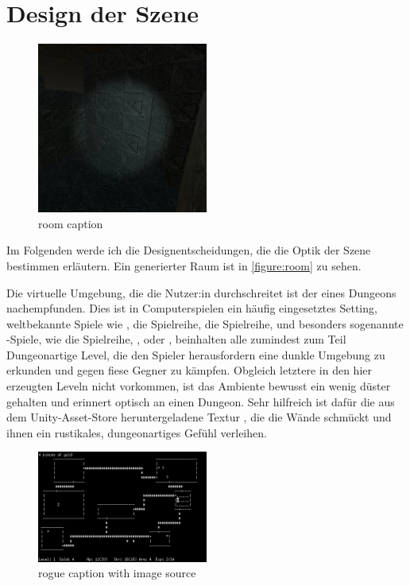 \section{Design der Szene} \label{sec:scene-design}

\begin{figure}[!h]
    \centering
    \includegraphics[width=0.5\textwidth]{vrscreenshots/rauminnen.jpg}
    \caption{room caption}\label{figure:room}
\end{figure}

Im Folgenden werde ich die Designentscheidungen, die die Optik der Szene bestimmen erläutern.
Ein generierter Raum ist in \autoref{figure:room} zu sehen.

Die virtuelle Umgebung, die die Nutzer:in durchschreitet ist der eines Dungeons nachempfunden. Dies ist in Computerspielen ein häufig eingesetztes Setting, weltbekannte Spiele wie
, %
die  Spielreihe,
die  Spielreihe,
und besonders sogenannte -Spiele, wie
die  Spielreihe,
,
oder , beinhalten alle zumindest zum Teil Dungeonartige Level, die den Spieler herausfordern eine dunkle Umgebung zu erkunden und gegen fiese Gegner zu kämpfen.
Obgleich letztere in den hier erzeugten Leveln nicht vorkommen, ist das  Ambiente bewusst ein wenig düster gehalten und erinnert optisch an einen Dungeon. Sehr hilfreich ist dafür die aus dem Unity-Asset-Store heruntergeladene Textur \cite{dungeon-material}, die die Wände schmückt und ihnen ein rustikales, dungeonartiges Gefühl verleihen.

\begin{figure}[!h]
    \centering
    \includegraphics[width=0.5\textwidth]{images/rogue.png}
    \caption{rogue caption with image source}
    \label{figure:rogue}
\end{figure}

